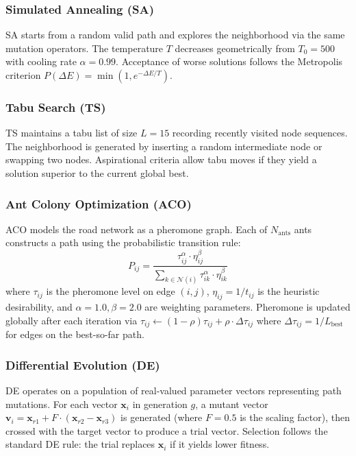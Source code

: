 \documentclass[journal]{IEEEtran}
\begin{document}
\subsubsection{Simulated Annealing (SA)}
SA starts from a random valid path and explores the neighborhood via the same mutation operators. The temperature $T$ decreases geometrically from $T_0 = 500$ with cooling rate $\alpha = 0.99$. Acceptance of worse solutions follows the Metropolis criterion $P(\Delta E) = \min(1, e^{-\Delta E / T})$.

\subsubsection{Tabu Search (TS)}
TS maintains a tabu list of size $L = 15$ recording recently visited node sequences. The neighborhood is generated by inserting a random intermediate node or swapping two nodes. Aspirational criteria allow tabu moves if they yield a solution superior to the current global best.

\subsubsection{Ant Colony Optimization (ACO)}
ACO models the road network as a pheromone graph. Each of $N_{\text{ants}}$ ants constructs a path using the probabilistic transition rule:
\begin{equation}
P_{ij} = \frac{\tau_{ij}^\alpha \cdot \eta_{ij}^\beta}{\sum_{k \in \mathcal{N}(i)} \tau_{ik}^\alpha \cdot \eta_{ik}^\beta}
\label{eq:aco_prob}
\end{equation}
where $\tau_{ij}$ is the pheromone level on edge $(i,j)$, $\eta_{ij} = 1 / t_{ij}$ is the heuristic desirability, and $\alpha = 1.0, \beta = 2.0$ are weighting parameters. Pheromone is updated globally after each iteration via $\tau_{ij} \leftarrow (1 - \rho) \tau_{ij} + \rho \cdot \Delta \tau_{ij}$ where $\Delta \tau_{ij} = 1 / L_{\text{best}}$ for edges on the best-so-far path.

\subsubsection{Differential Evolution (DE)}
DE operates on a population of real-valued parameter vectors representing path mutations. For each vector $\mathbf{x}_i$ in generation $g$, a mutant vector $\mathbf{v}_i = \mathbf{x}_{r1} + F \cdot (\mathbf{x}_{r2} - \mathbf{x}_{r3})$ is generated (where $F = 0.5$ is the scaling factor), then crossed with the target vector to produce a trial vector. Selection follows the standard DE rule: the trial replaces $\mathbf{x}_i$ if it yields lower fitness.
\end{document}
